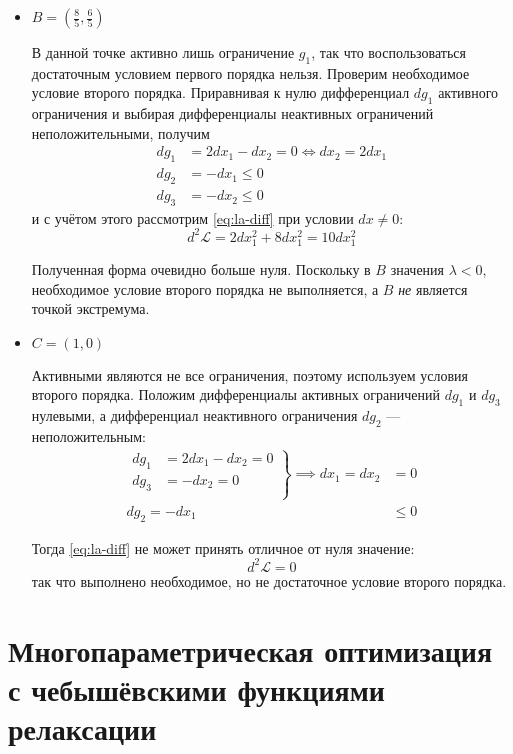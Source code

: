 \documentclass{article}
\renewcommand{\leq}{\leqslant}
\providecommand{\La}{\mathcal{L}}
\numberwithin{equation}{section}
\begin{document}
\begin{itemize}
\item $B = (\frac{8}{5}, \frac{6}{5})$

  В данной точке активно лишь ограничение $g_1$, так что
  воспользоваться достаточным условием первого порядка нельзя.
  Проверим необходимое условие второго порядка. Приравнивая к нулю
  дифференциал $dg_1$ активного ограничения и выбирая дифференциалы
  неактивных ограничений неположительными, получим
  \begin{align*}
    dg_1 &= 2dx_1-dx_2 = 0 \iff dx_2 = 2dx_1 \\
    dg_2 &= -dx_1 \leq 0 \\
    dg_3 &= -dx_2 \leq 0
  \end{align*}
  и с учётом этого рассмотрим \eqref{eq:la-diff} при условии $dx≠0$:
  \begin{equation*}
    d^2\La = 2dx_1^2 + 8dx_1^2 = 10dx_1^2
  \end{equation*}
  
  Полученная форма очевидно больше нуля. Поскольку в $B$ значения
  $\lambda < 0$, необходимое условие второго порядка не выполняется, а
  $B$ \emph{не} является точкой экстремума.

\item $C = (1, 0)$

  Активными являются не все ограничения, поэтому используем условия
  второго порядка. Положим дифференциалы активных ограничений $dg_1$ и
  $dg_3$ нулевыми, а дифференциал неактивного ограничения $dg_2$ —
  неположительным:
  \begin{align*}
    \left.
      \begin{aligned}
        dg_1 &= 2dx_1-dx_2 = 0 \\
        dg_3 &= - dx_2 = 0 \\
      \end{aligned}
    \right \} \implies dx_1 = dx_2 &= 0 \\
    dg_2 = - dx_1 &\leq 0
  \end{align*}
  
  Тогда \eqref{eq:la-diff} не может принять отличное от нуля значение:
  \begin{equation}
    d^2\La = 0
  \end{equation}
  так что выполнено необходимое, но не достаточное условие второго
  порядка.
\end{itemize}
  
\clearpage
\section{Многопараметрическая оптимизация\\
  с чебышёвскими функциями релаксации}
\end{document}
